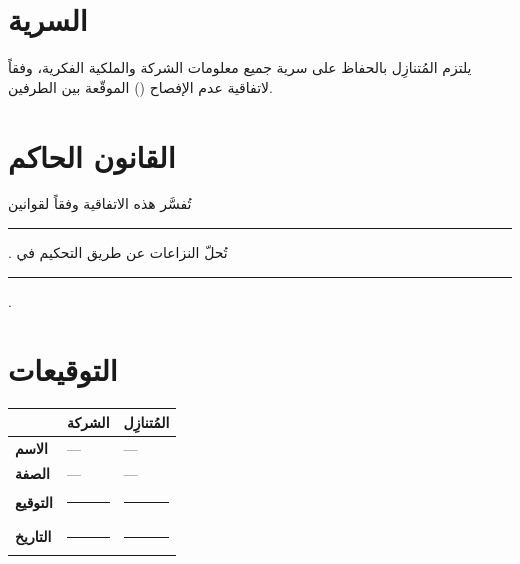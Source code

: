 \documentclass[12pt,a4paper]{article}
\begin{document}
\section{السرية}
\label{sec:confidentiality}
يلتزم المُتنازِل بالحفاظ على سرية جميع معلومات الشركة والملكية الفكرية، وفقاً لاتفاقية عدم الإفصاح () الموقّعة بين الطرفين.

\section{القانون الحاكم}
\label{sec:law}
تُفسَّر هذه الاتفاقية وفقاً لقوانين \rule{6cm}{0.4pt}. تُحلّ النزاعات عن طريق التحكيم في \rule{4cm}{0.4pt}.

\vspace{2em}
\section*{التوقيعات}

\begin{table}[H]
\centering
\renewcommand{\arraystretch}{2.5}
\begin{tabularx}{\textwidth}{L{5cm} X X}
\toprule
& \textbf{الشركة} & \textbf{المُتنازِل} \\
\midrule
\textbf{الاسم} & --- & --- \\
\textbf{الصفة} & --- & --- \\
\textbf{التوقيع} & \rule{4cm}{0.4pt} & \rule{4cm}{0.4pt} \\
\textbf{التاريخ} & \rule{4cm}{0.4pt} & \rule{4cm}{0.4pt} \\
\bottomrule
\end{tabularx}
\end{table}
\end{document}
